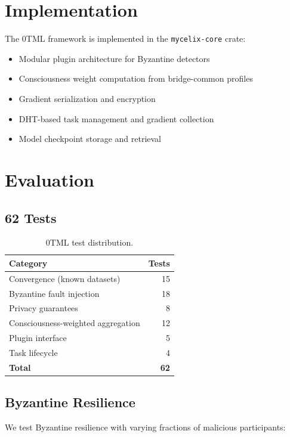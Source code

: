 \documentclass[11pt,twocolumn]{article}
\begin{document}
\section{Implementation}

The 0TML framework is implemented in the \texttt{mycelix-core} crate:

\begin{itemize}[nosep]
  \item Modular plugin architecture for Byzantine detectors
  \item Consciousness weight computation from bridge-common profiles
  \item Gradient serialization and encryption
  \item DHT-based task management and gradient collection
  \item Model checkpoint storage and retrieval
\end{itemize}

\section{Evaluation}

\subsection{62 Tests}

\begin{table}[h]
\centering
\begin{tabular}{lr}
\toprule
\textbf{Category} & \textbf{Tests} \\
\midrule
Convergence (known datasets) & 15 \\
Byzantine fault injection & 18 \\
Privacy guarantees & 8 \\
Consciousness-weighted aggregation & 12 \\
Plugin interface & 5 \\
Task lifecycle & 4 \\
\midrule
\textbf{Total} & \textbf{62} \\
\bottomrule
\end{tabular}
\caption{0TML test distribution.}
\end{table}

\subsection{Byzantine Resilience}

We test Byzantine resilience with varying fractions of malicious
participants:
\end{document}
